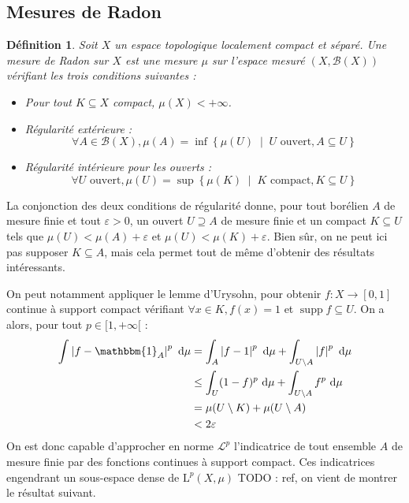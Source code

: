 \documentclass[a4paper,12pt]{article}
\newtheorem{definition}[theorem]{Définition}
\newcommand{\Bor}{\mathcal{B}}
\newcommand{\abs}[1]{\left\vert#1\right\vert}
\newcommand{\set}[1]{\left\{ #1 \right\}}
\newcommand{\indic}{\mathbbm{1}}
\newcommand{\integral}[4]{\int_{#1}^{#2} #3~\mathrm{d}#4}
\newcommand{\tq}{\;\middle|\;}
\newcommand{\TODO}[1]{{\color{red}TODO :} #1}
\DeclareMathOperator{\Supp}{supp}
\begin{document}
\subsection*{Mesures de Radon}

\begin{definition}
    Soit $X$ un espace topologique localement compact et séparé. Une \emph{mesure de Radon} sur $X$
    est une mesure $\mu$ sur l'espace mesuré $(X, \Bor(X))$ vérifiant les trois conditions suivantes :
    \begin{itemize}
        \item Pour tout $K\subseteq X$ compact, $\mu(X)<+\infty$.
        \item Régularité extérieure : 
        \begin{equation*}
            \forall A\in\Bor(X), \mu(A) = \inf \set{\mu(U) \tq U\text{ ouvert}, A\subseteq U}
        \end{equation*}
        \item Régularité intérieure pour les ouverts : 
        \begin{equation*}
            \forall U\text{ ouvert}, \mu(U) = \sup \set{\mu(K) \tq K\text{ compact}, K\subseteq U}
        \end{equation*}
    \end{itemize}
\end{definition}

La conjonction des deux conditions de régularité donne, pour tout borélien $A$ de mesure finie et tout $\varepsilon>0$,
un ouvert $U\supseteq A$ de mesure finie et un compact $K\subseteq U$ tels que $\mu(U)<\mu(A)+\varepsilon$ et 
$\mu(U)<\mu(K)+\varepsilon$. Bien sûr, on ne peut ici pas supposer $K\subseteq A$, mais cela permet 
tout de même d'obtenir des résultats intéressants.

On peut notamment appliquer le lemme d'Urysohn, pour obtenir $f:X\to[0,1]$ continue à support compact
vérifiant $\forall x\in K, f(x) = 1$ et $\Supp f\subseteq U$. On a alors, pour tout $p\in[1, +\infty[$ : 
\begin{align*}
    \integral{}{}{\abs{f-\indic_A}^p}{\mu} 
        &= \integral{A}{}{\abs{f-1}^p}{\mu} + \integral{U\setminus A}{}{\abs{f}^p}{\mu} \\
        &\le \integral{U}{}{(1-f)^p}{\mu} + \integral{U\setminus A}{}{f^p}{\mu} \\
        &= \mu(U\setminus K) + \mu(U\setminus A) \\
        &< 2\varepsilon
\end{align*}
On est donc capable d'approcher en norme $\mathscr{L}^p$ l'indicatrice de tout ensemble $A$ de mesure finie par des fonctions continues 
à support compact. Ces indicatrices engendrant un sous-espace dense de $\mathrm{L}^p(X, \mu)$ \TODO{ref}, on vient de montrer le résultat suivant.
\end{document}
